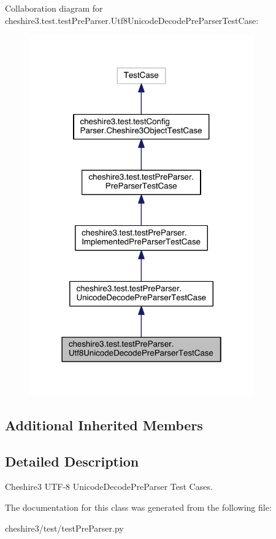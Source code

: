 Collaboration diagram for cheshire3.\-test.\-test\-Pre\-Parser.\-Utf8\-Unicode\-Decode\-Pre\-Parser\-Test\-Case\-:
\nopagebreak
\begin{figure}[H]
\begin{center}
\leavevmode
\includegraphics[width=274pt]{classcheshire3_1_1test_1_1test_pre_parser_1_1_utf8_unicode_decode_pre_parser_test_case__coll__graph}
\end{center}
\end{figure}
\subsection*{Additional Inherited Members}


\subsection{Detailed Description}
\begin{DoxyVerb}Cheshire3 UTF-8 UnicodeDecodePreParser Test Cases.\end{DoxyVerb}
 

The documentation for this class was generated from the following file\-:\begin{DoxyCompactItemize}
\item 
cheshire3/test/test\-Pre\-Parser.\-py\end{DoxyCompactItemize}
